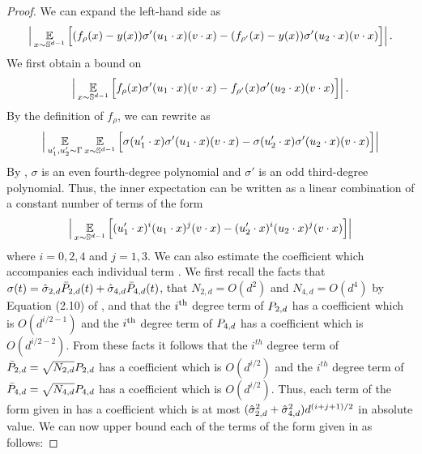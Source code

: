 \begin{proof}
We can expand the left-hand side as
\begin{align} \label{eq:gradient_expected_different_dists}
\Big| \operatorname*{\mathbb{E}}_{x \sim \mathbb{S}^{d - 1}} \Big[(f_\rho(x) - y(x)) \sigma'(u_1 \cdot x) (v \cdot x) - (f_{\rho'}(x) - y(x)) \sigma'(u_2 \cdot x) (v \cdot x) \Big] \Big| \,.
\end{align}
We first obtain a bound on
\begin{align} \label{eq:gradient_expectation_first_part}
\Big| \operatorname*{\mathbb{E}}_{x \sim \mathbb{S}^{d - 1}} \Big[ f_\rho(x) \sigma'(u_1 \cdot x) (v \cdot x) - f_{\rho'}(x) \sigma'(u_2 \cdot x) (v \cdot x) \Big] \Big| \,.
\end{align}
By the definition of $f_\rho$, we can rewrite  as
\begin{align}
\Big| \operatorname*{\mathbb{E}}_{u_1', u_2' \sim \Gamma} \operatorname*{\mathbb{E}}_{x \sim \mathbb{S}^{d - 1}} \Big[ \sigma(u_1' \cdot x) \sigma'(u_1 \cdot x) (v \cdot x) - \sigma(u_2' \cdot x) \sigma'(u_2 \cdot x) (v \cdot x) \Big] \Big|
\end{align}
By , $\sigma$ is an even fourth-degree polynomial and $\sigma'$ is an odd third-degree polynomial. Thus, the inner expectation can be written as a linear combination of a constant number of terms of the form
\begin{align} \label{eq:gradient_expectation_indiv_term}
\Big| \operatorname*{\mathbb{E}}_{x \sim \mathbb{S}^{d - 1}} \Big[ (u_1' \cdot x)^i (u_1 \cdot x)^j (v \cdot x) - (u_2' \cdot x)^i (u_2 \cdot x)^j (v \cdot x) \Big] \Big|
\end{align}
where $i = 0, 2, 4$ and $j = 1, 3$. We can also estimate the coefficient which accompanies each individual term . We first recall the facts that $\sigma(t) = \hat{\sigma}_{2, d} {\bar{P}_{2, d}}(t) + \hat{\sigma}_{4, d} {\bar{P}_{4, d}}(t)$, that $N_{2, d} = O(d^2)$ and $N_{4, d} = O(d^4)$ by Equation (2.10) of \citet{atkinson2012spherical}, and that the $i^{\textup{th}}$ degree term of ${P_{2, d}}$ has a coefficient which is $O(d^{i/2 - 1})$ and the $i^{\textup{th}}$ degree term of ${P_{4, d}}$ has a coefficient which is $O(d^{i/2 - 2})$. From these facts it follows that the $i^{th}$ degree term of ${\bar{P}_{2, d}} = \sqrt{N_{2, d}} {P_{2, d}}$ has a coefficient which is $O(d^{i/2})$ and the $i^{th}$ degree term of ${\bar{P}_{4, d}} = \sqrt{N_{4, d}} {P_{4, d}}$ has a coefficient which is $O(d^{i/2})$. Thus, each term of the form given in  has a coefficient which is at most $(\hat{\sigma}_{2, d}^2 + \hat{\sigma}_{4, d}^2) d^{(i + j + 1)/2}$ in absolute value. We can now upper bound each of the terms of the form given in  as follows:

\end{proof}
